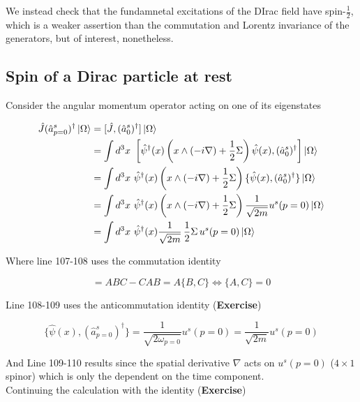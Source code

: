 \noindent We instead check that the fundamnetal excitations of the DIrac field have spin-$\frac{1}{2}$, which is a weaker assertion than the commutation and Lorentz invariance of the generators, but of interest, nonetheless.

\subsection*{Spin of a Dirac particle at rest}

\noindent Consider the angular momentum operator acting on one of its eigenstates

\begin{align}
\hat{J} (\hat{a}_{p=0}^s)^\dagger \ket{\Omega} &= [\hat{J}, (\hat{a}_{0}^s)^\dagger] \ket{\Omega} \\
&= \int d^3 x \,\, \left[ \hat{\psi}^\dagger (x) \left( x \wedge (-i \nabla) + \frac{1}{2} \Sigma \right) \hat{\psi} (x), (\hat{a}_{0}^s)^\dagger \right] \ket{\Omega} \\
&= \int d^3 x \,\, \hat{\psi}^\dagger (x) \left( x \wedge (-i \nabla) + \frac{1}{2} \Sigma \right) \{ \hat{\psi} (x), (\hat{a}_0^s)^{\dagger} \} \ket{\Omega} \\
&= \int d^3 x \,\, \hat{\psi}^\dagger (x) \left( x \wedge (-i \nabla) + \frac{1}{2} \Sigma \right) \frac{1}{\sqrt{2m}} u^s (p=0) \ket{\Omega} \\
&= \int d^3 x \,\, \hat{\psi}^\dagger (x) \frac{1}{\sqrt{2 m}} \, \frac{1}{2} \Sigma \, u^s(p=0) \ket{\Omega} 
\end{align}

\noindent Where line 107-108 uses the commutation identity 

\begin{equation}
[AB, C] = ABC - CAB = A \{B,C\} \iff \{A,C\}=0
\end{equation}

\noindent Line 108-109 uses the anticommutation identity (\textbf{Exercise})

\begin{equation}
\{ \hat{\psi} (x), (\hat{a}_{p=0}^s)^\dagger \} = \frac{1}{\sqrt{2 \omega_{p=0}}} u^s (p=0) = \frac{1}{\sqrt{2m}} u^s (p=0)
\end{equation}

\noindent And Line 109-110 results since the spatial derivative $\nabla$ acts on $u^s (p=0)$ ($4 \times 1$ spinor) which is only the dependent on the time component. \\

\noindent Continuing the calculation with the identity (\textbf{Exercise})

